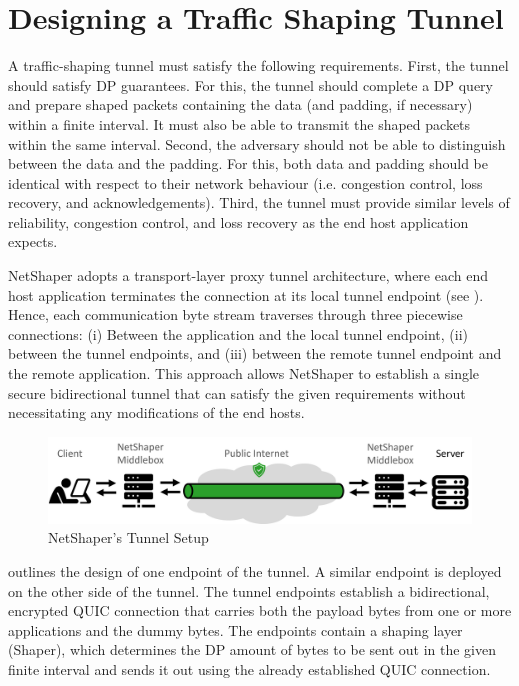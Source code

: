 \section{Designing a Traffic Shaping Tunnel}
\label{sec:netshaper-designing-traffic-shaping-tunnel}

A traffic-shaping tunnel must satisfy the following requirements.
First, the tunnel should satisfy DP guarantees.
For this, the tunnel should complete a DP query and prepare shaped packets containing the data (and padding, if necessary) within a finite interval.
It must also be able to transmit the shaped packets within the same interval.
Second, the adversary should not be able to distinguish between the data and the padding.
For this, both data and padding should be identical with respect to their network behaviour (i.e. congestion control, loss recovery, and acknowledgements).
Third, the tunnel must provide similar levels of reliability, congestion control, and loss recovery as the end host application expects.

NetShaper adopts a transport-layer proxy tunnel architecture, where each end host application terminates the connection at its local tunnel endpoint (see ). 
Hence, each communication byte stream traverses through three piecewise connections: 
(i) Between the application and the local tunnel endpoint, 
(ii) between the tunnel endpoints, 
and (iii) between the remote tunnel endpoint and the remote application.
This approach allows NetShaper to establish a single secure bidirectional tunnel that can satisfy the given requirements without necessitating any modifications of the end hosts.

\begin{figure}[!htb]
    \centering
    \includegraphics[width=\columnwidth]{figures/netshaper/netshaper-setup.png}
    \caption{NetShaper's Tunnel Setup}
    \label{fig:netshaper-setup}
\end{figure}

 outlines the design of one endpoint of the tunnel. A similar endpoint is deployed on the other side of the tunnel.
The tunnel endpoints establish a bidirectional, encrypted QUIC connection that carries both the payload bytes from one or more applications and the dummy bytes.
The endpoints contain a shaping layer (Shaper), which determines the DP amount of bytes to be sent out in the given finite interval and sends it out using the already established QUIC connection.

